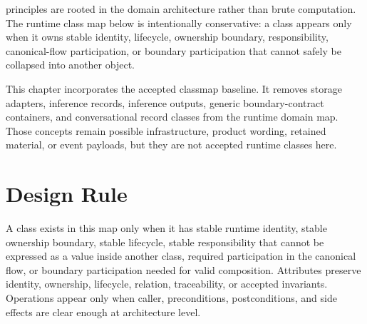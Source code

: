 

\Madre principles are rooted in the domain architecture rather than brute computation. The runtime class map below is intentionally conservative: a class appears only when it owns stable identity, lifecycle, ownership boundary, responsibility, canonical-flow participation, or boundary participation that cannot safely be collapsed into another object.\n

This chapter incorporates the accepted classmap baseline. It removes storage adapters, inference records, inference outputs, generic boundary-contract containers, and conversational record classes from the runtime domain map. Those concepts remain possible infrastructure, product wording, retained material, or event payloads, but they are not accepted runtime classes here.\n

\section{Design Rule}

A class exists in this map only when it has stable runtime identity, stable ownership boundary, stable lifecycle, stable responsibility that cannot be expressed as a value inside another class, required participation in the canonical \Madre flow, or boundary participation needed for valid composition. Attributes preserve identity, ownership, lifecycle, relation, traceability, or accepted invariants. Operations appear only when caller, preconditions, postconditions, and side effects are clear enough at architecture level.\n

